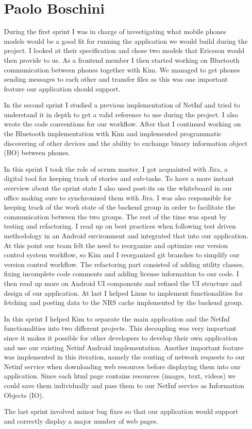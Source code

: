 \section{Paolo Boschini}
During the first sprint I was in charge of investigating what mobile phones models
would be a good fit for running the application we would build during the project.
I looked at their specification and chose two models that Ericsson would then provide to us.
As a frontend member I then started working on Bluetooth communication between phones
together with Kim. We managed to get phones sending messages to each other and transfer
files as this was one important feature our application should support.

In the second sprint I studied a previous implementation of NetInf and tried to understand
it in depth to get a valid reference to use during the project. 
I also wrote the code conventions for our workflow. After that I continued working on the Bluetooth implementation
with Kim and implemented programmatic discovering of other devices and the ability to
exchange binary information object (BO) between phones.

In this sprint I took the role of scrum master. I got acquainted with Jira, a digital tool for keeping track of stories and sub-tasks.
To have a more instant overview about the sprint state I also used post-its on the whiteboard in our office making sure to synchronized them with Jira.
I was also responsible for keeping track of the work state of the backend group in order to facilitate the communication between
the two groups. The rest of the time was spent by testing and refactoring. I read up on best practices when following 
test driven methodology in an Android environment and integrated that into our application.
At this point our team felt the need to reorganize and optimize our version control system workflow,
so Kim and I reorganized git branches to simplify our version control workflow.
The refactoring part consisted of adding utility classes, fixing incomplete code comments and adding license
information to our code. I then read up more on Android UI components and refined the UI structure and design of our application.
At last I helped Linus to implement functionalities for fetching and posting data to the NRS cache implemented by the backend group.

In this sprint I helped Kim to separate the main application and the NetInf functionalities into two different projects.
This decoupling was very important since it makes it possible for other developers to develop their own application
and use our existing Netinf Android implementation.
Another important feature was implemented in this iteration, namely the routing of network requests to our Netinf service
when downloading web resources before displaying them into our application. Since each html page contains resources (images, text, videos) we could
save them individually and pass them to our NetInf service as Information Objects (IO).

The last sprint involved minor bug fixes so that our application would support and correctly display a major number of web pages.
